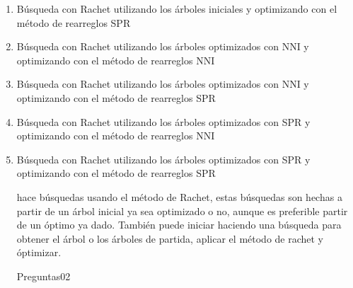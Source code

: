 \begin{itemize}
\begin{enumerate}
\item B\'usqueda con Rachet utilizando los \'arboles iniciales y optimizando con el m\'etodo de rearreglos SPR



\item B\'usqueda con Rachet utilizando los \'arboles optimizados con NNI y optimizando con el m\'etodo de rearreglos NNI




\item B\'usqueda con Rachet utilizando los \'arboles optimizados con NNI y optimizando con el m\'etodo de rearreglos SPR





\item B\'usqueda con Rachet utilizando los \'arboles optimizados con SPR y optimizando con el m\'etodo de rearreglos NNI




\item B\'usqueda con Rachet utilizando los \'arboles optimizados con SPR y optimizando con el m\'etodo de rearreglos SPR





 hace b\'usquedas usando el m\'etodo de Rachet, estas b\'usquedas son hechas a partir de un \'arbol inicial ya sea optimizado o no,  aunque es preferible partir de un \'optimo ya dado. Tambi\'en puede iniciar haciendo una b\'usqueda para obtener el \'arbol o los \'arboles de partida, aplicar el m\'etodo de rachet y \'optimizar.



{Preguntas02}


\end{enumerate}
\end{itemize}
